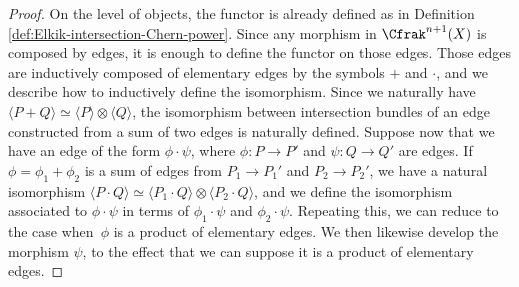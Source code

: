 \begin{proof}
On the level of objects, the functor is already defined as in Definition \ref{def:Elkik-intersection-Chern-power}. Since any morphism in $\Cfrak^{n+1}(X)$ is composed by edges, it is enough to define the functor on those edges. Those edges are inductively composed of elementary edges by the symbols $+$ and $\cdot$, and we describe how to inductively define the isomorphism. Since we naturally have $\langle P + Q \rangle \simeq \langle P \rangle \otimes \langle Q \rangle$, the isomorphism between intersection bundles of an edge constructed from a sum of two edges is naturally defined. Suppose now that we have an edge of the form $\phi \cdot \psi$, where $\phi: P \to P'$ and $\psi: Q \to Q'$ are edges. If $\phi = \phi_1 + \phi_2$ is a sum of edges from $P_1 \to P_1'$ and $P_2 \to P_2'$, we have a natural isomorphism $\langle P \cdot Q\rangle \simeq \langle P_1 \cdot Q \rangle \otimes \langle P_2 \cdot Q \rangle $, and we define the isomorphism associated to $\phi \cdot \psi$ in terms of $\phi_1 \cdot \psi$ and $\phi_2 \cdot \psi$. Repeating this, we can reduce to the case when~$\phi$ is a product of elementary edges. We then likewise develop the morphism $\psi$, to the effect that we can suppose it is a product of elementary edges.


\end{proof}

